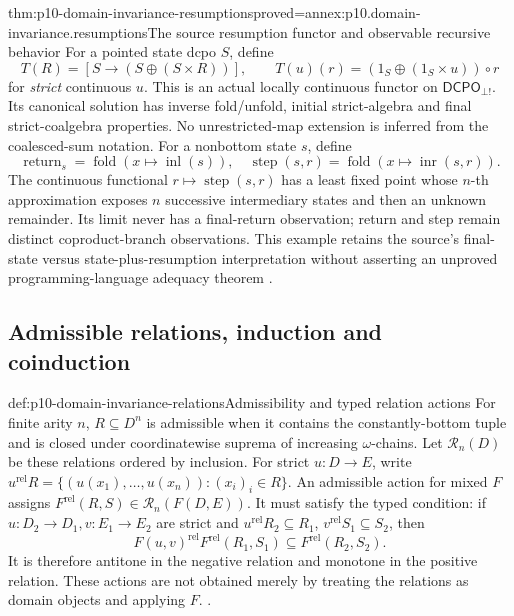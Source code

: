 \begin{hbtheorem}{thm:p10-domain-invariance-resumptions}{proved=annex:p10.domain-invariance.resumptions}{The source resumption functor and observable recursive behavior}
For a pointed state dcpo \(S\), define
\[
 T(R)=[S\longrightarrow(S\oplus(S\times R))],\qquad
 T(u)(r)=(1_S\oplus(1_S\times u))\circ r
\]
for \emph{strict} continuous \(u\). This is an actual locally
continuous functor on \(\mathsf{DCPO}_{\bot!}\). Its canonical
solution has inverse fold/unfold, initial strict-algebra and
final strict-coalgebra properties. No unrestricted-map extension
is inferred from the coalesced-sum notation.
For a nonbottom state \(s\), define
\[
 \operatorname{return}_s=\operatorname{fold}(x\mapsto\operatorname{inl}(s)),
 \quad
 \operatorname{step}(s,r)=\operatorname{fold}
              (x\mapsto\operatorname{inr}(s,r)).
\]
The continuous functional \(r\mapsto\operatorname{step}(s,r)\)
has a least fixed point whose \(n\)-th approximation exposes
\(n\) successive intermediary states and then an unknown remainder.
Its limit never has a final-return observation; return and step
remain distinct coproduct-branch observations. This example
retains the source's final-state versus state-plus-resumption
interpretation without asserting an unproved programming-language
adequacy theorem \cite[Section~5.1.2, pp.~68--69]
{AbramskyJungCorrectedExpandedDomainTheory}.
\end{hbtheorem}

\subsection{Admissible relations, induction and coinduction}

\begin{hbdefinition}{def:p10-domain-invariance-relations}{Admissibility and typed relation actions}
For finite arity \(n\), \(R\subseteq D^n\) is admissible when
it contains the constantly-bottom tuple and is closed under
coordinatewise suprema of increasing \(\omega\)-chains. Let
\(\mathcal R_n(D)\) be these relations ordered by inclusion.
For strict \(u:D\to E\), write
\(u^{\mathrm{rel}}R=\{(u(x_1),\ldots,u(x_n)):(x_i)_i\in R\}\).
An admissible action for mixed \(F\) assigns
\(F^{\mathrm{rel}}(R,S)\in\mathcal R_n(F(D,E))\).
It must satisfy the typed condition: if
\(u:D_2\to D_1,v:E_1\to E_2\) are strict and
\(u^{\mathrm{rel}}R_2\subseteq R_1\),
\(v^{\mathrm{rel}}S_1\subseteq S_2\), then
\[
 F(u,v)^{\mathrm{rel}}F^{\mathrm{rel}}(R_1,S_1)
                       \subseteq F^{\mathrm{rel}}(R_2,S_2).
\]
It is therefore antitone in the negative relation and monotone
in the positive relation. These actions are not obtained merely
by treating the relations as domain objects and applying \(F\).
\cite[Definitions~5.4.1,5.4.3; Proposition~5.4.4, pp.~80--81]
{AbramskyJungCorrectedExpandedDomainTheory}.
\end{hbdefinition}

